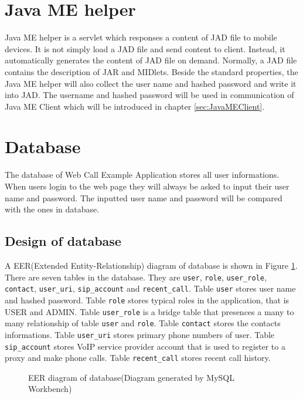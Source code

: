 \section{Java ME helper}
\label{sec:WebApplication:JavaMEHelper}

Java ME helper is a servlet which responses a content of JAD file to mobile devices. It is not simply load a JAD file and send content to client. Instead, it automatically generates the content of JAD file on demand. Normally, a JAD file contains the description of JAR and MIDlets. Beside the standard properties, the Java ME helper will also collect the user name and hashed password and write it into JAD. The username and hashed password will be used in communication of Java ME Client which will be introduced in chapter \ref{sec:JavaMEClient}.

\section{Database}
\label{sec:WebApplication:Database}

The database of Web Call Example Application stores all user informations. When users login to the web page they will always be asked to input their user name and password. The inputted user name and password will be compared with the ones in database. 

\subsection{Design of database}
\label{sec:WebApplication:Database:DesignOfDatabase}

A EER(Extended Entity-Relationship) diagram of database is shown in Figure \ref{fig:EERDiagram}. There are seven tables in the database. They are \texttt{user}, \texttt{role}, \texttt{user\_role}, \texttt{contact}, \texttt{user\_uri}, \texttt{sip\_account} and \texttt{recent\_call}. Table \texttt{user} stores user name and hashed password. Table \texttt{role} stores typical roles in the application, that is USER and ADMIN. Table \texttt{user\_role} is a bridge table that presences a many to many relationship of table \texttt{user} and \texttt{role}. Table \texttt{contact} stores the contacts informations. Table \texttt{user\_uri} stores primary phone numbers of user. Table \texttt{sip\_account} stores VoIP service provider account that is used to register to a proxy and make phone calls. Table \texttt{recent\_call} stores recent call history.

\begin{figure}[!hbtp]
\centering
{}
\caption{EER diagram of database(Diagram generated by \textsf{MySQL Workbench})}
\label{fig:EERDiagram}
\end{figure} 

